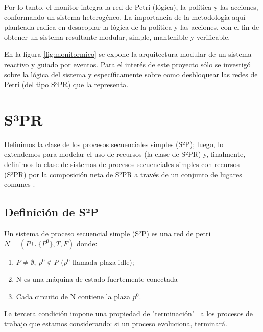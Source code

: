 Por lo tanto, el monitor integra la red de Petri (lógica), la política y las acciones, conformando un sistema heterogéneo. La importancia de la metodología aquí planteada radica en desacoplar la lógica de la política y las acciones, con el fin de obtener un sistema resultante modular, simple, mantenible y verificable. 

En la figura \ref{fig:monitormico} se expone la arquitectura modular de un sistema reactivo y guiado por eventos. Para el interés de este proyecto sólo se investigó sobre la lógica del sistema y específicamente sobre como desbloquear las redes de Petri (del tipo S³PR) que la representa. 


\section[S³PR]{S³PR}
Definimos la clase de los procesos secuenciales simples (S²P); luego, lo extendemos para modelar el uso de recursos (la clase de S²PR) y, finalmente, definimos la clase de sistemas de procesos secuenciales simples con recursos (S³PR) por la composición neta de S²PR a través de un conjunto de lugares comunes \cite{libro2}.

\subsection{Definición de S²P}
Un sistema de proceso secuencial simple (S²P) es una red de petri $N = (P \cup \{P^0\}, T, F)$ donde:
\begin{enumerate}
    \item $P \neq \emptyset,\ p^0 \notin P$ ($p^0$ llamada plaza idle);
    \item N es una máquina de estado fuertemente conectada
    \item Cada circuito de N contiene la plaza $p^0$.
\end{enumerate}

\noindent La tercera condición impone una propiedad de "terminación" \ a los procesos de trabajo que estamos considerando: si un proceso evoluciona, terminará.

